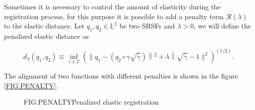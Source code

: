 
Sometimes it is necessary to control the amount of elasticity during the
registration process, for this purpose it is possible to add a penalty term
$\mathcal{R}(\lambda)$ to the elastic distance.
Let $q_1, q_2 \in \mathbb{L}^2$ be two SRSFs and $\lambda > 0$, we will define
the penalized elastic distance as

$$
d_{\lambda}\left(q_{1}, q_{2}\right) \equiv \inf _{\gamma \in \Gamma}\left(
\| q_{1}-\left(q_{2} \circ \gamma \sqrt{\dot{\gamma}}\right)\left\|^{2}+
\lambda\right\| \sqrt{\dot{\gamma}}-1 \|^{2} \right)^{(1 / 2)}.
$$

The alignment of two functions with different penalties is shown in the figure \ref{FIG:PENALTY}.

\begin{figure}[Penalized elastic registration]{FIG:PENALTY}{Penalized elastic registration}
   \quad
\end{figure}
